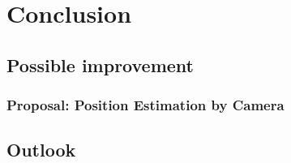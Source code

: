 \chapter{Conclusion}
\label{sec:Conclusion}

\section{Possible improvement}
\label{sec:improvement}

\subsection{Proposal: Position Estimation by Camera}

\section{Outlook}
\label{sec:outlook}
